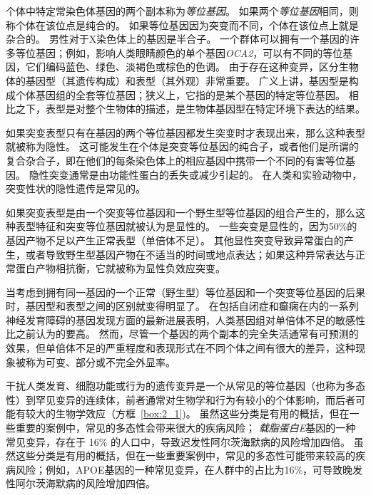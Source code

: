 个体中特定常染色体基因的两个副本称为\textit{等位基因}。
如果两个\textit{等位基因}相同，则称个体在该位点是纯合的。
如果等位基因因为突变而不同，个体在该位点上就是杂合的。
男性对于X染色体上的基因是半合子。
一个群体可以拥有一个基因的许多等位基因；例如，影响人类眼睛颜色的单个基因\textit{OCA2}，可以有不同的等位基因，它们编码蓝色、绿色、淡褐色或棕色的色调。
由于存在这种变异，区分生物体的基因型（其遗传构成）和表型（其外观）非常重要。
广义上讲，基因型是构成个体基因组的全套等位基因；狭义上，它指的是某个基因的特定等位基因。
相比之下，表型是对整个生物体的描述，是生物体基因型在特定环境下表达的结果。


如果突变表型只有在基因的两个等位基因都发生突变时才表现出来，那么这种表型就被称为隐性。
这可能发生在个体是突变等位基因的纯合子，或者他们是所谓的复合杂合子，即在他们的每条染色体上的相应基因中携带一个不同的有害等位基因。
隐性突变通常是由功能性蛋白的丢失或减少引起的。
在人类和实验动物中，突变性状的隐性遗传是常见的。


如果突变表型是由一个突变等位基因和一个野生型等位基因的组合产生的，那么这种表型特征和突变等位基因就被认为是显性的。
一些突变是显性的，因为50\%的基因产物不足以产生正常表型（单倍体不足）。
其他显性突变导致异常蛋白的产生，或者导致野生型基因产物在不适当的时间或地点表达；如果这种异常表达与正常蛋白产物相抗衡，它就被称为显性负效应突变。



当考虑到拥有同一基因的一个正常（野生型）等位基因和一个突变等位基因的后果时，基因型和表型之间的区别就变得明显了。
在包括自闭症和癫痫在内的一系列神经发育障碍的基因发现方面的最新进展表明，人类基因组对单倍体不足的敏感性比之前认为的要高。
然而，尽管一个基因的两个副本的完全失活通常有可预测的效果，但单倍体不足的严重程度和表现形式在不同个体之间有很大的差异，这种现象被称为可变、部分或不完全外显率。



干扰人类发育、细胞功能或行为的遗传变异是一个从常见的等位基因（也称为多态性）到罕见变异的连续体，前者通常对生物学和行为有较小的个体影响，而后者可能有较大的生物学效应（方框~\ref{box:2_1})。
虽然这些分类是有用的概括，但在一些重要的案例中，常见的多态性会带来很大的疾病风险；
\textit{载脂蛋白E}基因的一种常见变异，存在于 16\% 的人口中，导致迟发性阿尔茨海默病的风险增加四倍。
虽然这些分类是有用的概括，但在一些重要案例中，常见的多态性可能带来较高的疾病风险；例如，APOE基因的一种常见变异，在人群中的占比为16\%，可导致晚发性阿尔茨海默病的风险增加四倍。


